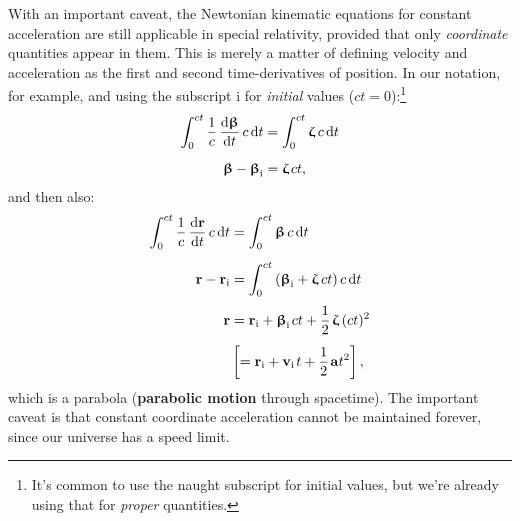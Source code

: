 \documentclass[12pt]{article}
\renewcommand{\vv}[1]{\mathbf{#1}}
\newcommand{\dd}[1]{\mathrm{d}#1}
\newcommand{\vvbeta}{\bm{\upbeta}}
\newcommand{\vvzeta}{\bm{\upzeta}}
\begin{document}
With an important caveat, the Newtonian kinematic equations for constant acceleration are still applicable in special relativity, provided that only \emph{coordinate} quantities appear in them. This is merely a matter of defining velocity and acceleration as the first and second time-derivatives of position. In our notation, for example, and using the subscript i for \emph{initial} values ($ct = 0$):\footnote{It's common to use the naught subscript for initial values, but we're already using that for \emph{proper} quantities.}
\begin{equation*}
\begin{aligned}
\int_0^{ct} \dfrac{1}{c} \, \dfrac{\dd \vvbeta}{\dd t} \, c \, \dd t &= \int_0^{ct} \vvzeta \, c \, \dd t \\[5pt]
\vvbeta -  \vvbeta_{\textrm{i}} &= \vvzeta \mkern2mu ct,
\end{aligned}
\end{equation*}
and then also:
\begin{equation*}
\begin{aligned}
\int_0^{ct} \dfrac{1}{c} \, \dfrac{\dd \vv r}{\dd t} \, c \, \dd t &= \int_0^{ct} \vvbeta \, c \, \dd t \\[5pt]
\vv r - \vv r_{\textrm{i}} &= \int_0^{ct} \left( \vvbeta_{\textrm{i}} + \vvzeta \, ct \right) c \, \dd t \\[3pt]
\vv r &= \vv r_{\textrm{i}} + \vvbeta_{\textrm{i}} \mkern2mu ct + \dfrac{1}{2} \mkern2mu \vvzeta \, ( ct )^2 \\[4pt]
& \left[ = \vv r_{\textrm{i}} + \vv v_{\textrm{i}} \mkern2mu t + \dfrac{1}{2} \mkern2mu \vv a t^2 \right] ,
\end{aligned}
\end{equation*}
which is a parabola (\textbf{parabolic motion} through spacetime). The important caveat is that constant coordinate acceleration cannot be maintained forever, since our universe has a speed limit.
\end{document}
